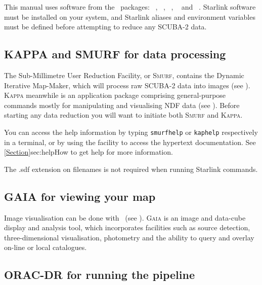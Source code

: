This manual uses software from the \starlink\ packages: \smurf\
\cite{smurf}, \Kappa\ \cite{kappa}, \gaia\ \cite{gaia}, \oracdr\
\cite{oracdr} and \picard\ \cite{picard}. Starlink software must be
installed on your system, and Starlink aliases and environment
variables must be defined before attempting to reduce any SCUBA-2
data.


\subsection{KAPPA and SMURF for data processing}

The Sub-Millimetre User Reduction Facility, or \textsc{Smurf},
contains the Dynamic Iterative Map-Maker, which will process raw
SCUBA-2 data into images (see \smurfsun). \textsc{Kappa} meanwhile is
an application package comprising general-purpose commands mostly for
manipulating and visualising NDF data (see \kappasun). Before starting
any data reduction you will want to initiate both \textsc{Smurf} and
\textsc{Kappa}.

\begin{terminalv}
\end{terminalv}

You can access the help information by typing \texttt{smurfhelp} or
\texttt{kaphelp} respectively in a terminal, or by using the
\task{showme} facility to access the hypertext documentation. See
\cref{Section}{sec:help}{How to get help} for more information.



\begin{tip}
The .sdf extension on filenames is not required when running
Starlink commands.
\end{tip}


\subsection{GAIA for viewing your map}

Image visualisation can be done with \gaia\ (see
\gaiasun). \textsc{Gaia} is an image and data-cube display and
analysis tool, which incorporates facilities such as source detection,
three-dimensional visualisation, photometry and the ability to query
and overlay on-line or local catalogues.
\begin{terminalv}
\end{terminalv}

\subsection{ORAC-DR for running the pipeline}

